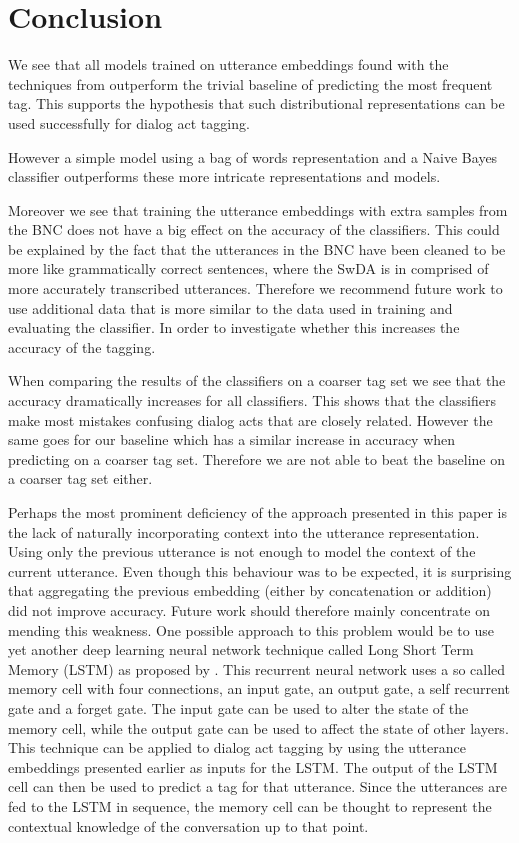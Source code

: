 \section{Conclusion}\label{sec:conclusion}
We see that all models trained on utterance embeddings found with the techniques from  outperform the trivial baseline of predicting the most frequent tag. This supports the hypothesis that such distributional representations can be used successfully for dialog act tagging.

However a simple model using a bag of words representation and a Naive Bayes classifier outperforms these more intricate representations and models. 

Moreover we see that training the utterance embeddings with extra samples from the BNC does not have a big effect on the accuracy of the classifiers. This could be explained by the fact that the utterances in the BNC have been cleaned to be more like grammatically correct sentences, where the SwDA is in comprised of more accurately transcribed utterances. Therefore we recommend future work to use additional data that is more similar to the data used in training and evaluating the classifier. In order to investigate whether this increases the accuracy of the tagging.

When comparing the results of the classifiers on a coarser tag set we see that the accuracy dramatically increases for all classifiers. This shows that the classifiers make most mistakes confusing dialog acts that are closely related. However the same goes for our baseline which has a similar increase in accuracy when predicting on a coarser tag set. Therefore we are not able to beat the baseline on a coarser tag set either.

Perhaps the most prominent deficiency of the approach presented in this paper is the lack of naturally incorporating context into the utterance representation. Using only the previous utterance is not enough to model the context of the current utterance. Even though this behaviour was to be expected, it is surprising that aggregating the previous embedding (either by concatenation or addition) did not improve accuracy. Future work should therefore mainly concentrate on mending this weakness. One possible approach to this problem would be to use yet another deep learning neural network technique called Long Short Term Memory (LSTM) as proposed by . This recurrent neural network uses a so called memory cell with four connections, an input gate, an output gate, a self recurrent gate and a forget gate. The input gate can be used to alter the state of the memory cell, while the output gate can be used to affect the state of other layers. This technique can be applied to dialog act tagging by using the utterance embeddings presented earlier as inputs for the LSTM. The output of the LSTM cell can then be used to predict a tag for that utterance. Since the utterances are fed to the LSTM in sequence, the memory cell can be thought to represent the contextual knowledge of the conversation up to that point.

